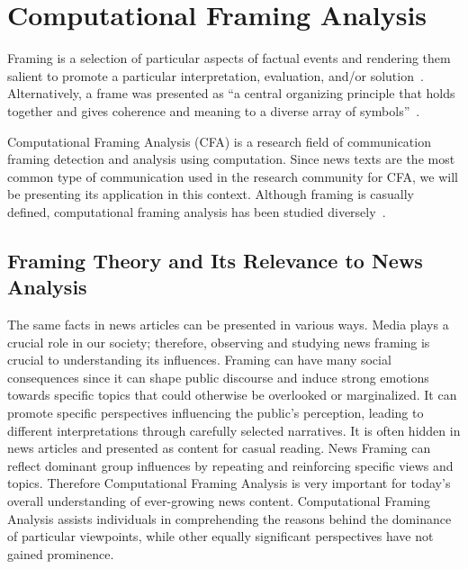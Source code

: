 % 
\chapter{Computational Framing Analysis}
\label{ch:nfa}
Framing is a selection of particular aspects of factual events and rendering them salient to promote a particular interpretation, evaluation, and/or solution~\parencite{entman_framing_1993, entman_cascading_2003}.
Alternatively, a frame was presented as ``a central organizing principle that holds together and gives coherence and meaning to a diverse array of symbols''~\parencite{gamson1992media}.

Computational Framing Analysis (CFA) is a research field of communication framing detection and analysis using computation.
Since news texts are the most common type of communication used in the research community for CFA, we will be presenting its application in this context. 
Although framing is casually defined, computational framing analysis has been studied diversely~\parencite{ali-hassan-2022-survey}.

\section{Framing Theory and Its Relevance to News Analysis}

The same facts in news articles can be presented in various ways.
Media plays a crucial role in our society; therefore, observing and studying news framing is crucial to understanding its influences.
Framing can have many social consequences since it can shape public discourse and induce strong emotions towards specific topics that could otherwise be overlooked or marginalized.
It can promote specific perspectives influencing the public's perception, leading to different interpretations through carefully selected narratives.
It is often hidden in news articles and presented as content for casual reading.
News Framing can reflect dominant group influences by repeating and reinforcing specific views and topics.
Therefore Computational Framing Analysis is very important for today's overall understanding of ever-growing news content.
Computational Framing Analysis assists individuals in comprehending the reasons behind the dominance of particular viewpoints, while other equally significant perspectives have not gained prominence.

